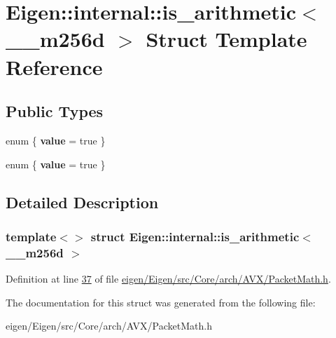 \hypertarget{struct_eigen_1_1internal_1_1is__arithmetic_3_01____m256d_01_4}{}\section{Eigen\+:\+:internal\+:\+:is\+\_\+arithmetic$<$ \+\_\+\+\_\+m256d $>$ Struct Template Reference}
\label{struct_eigen_1_1internal_1_1is__arithmetic_3_01____m256d_01_4}
\subsection*{Public Types}
\begin{DoxyCompactItemize}
\item 
\mbox{\label{struct_eigen_1_1internal_1_1is__arithmetic_3_01____m256d_01_4_ae117bb3f62159e9cf04736f232c2cc60}} 
enum \{ {\bfseries value} = true
 \}
\item 
\mbox{\label{struct_eigen_1_1internal_1_1is__arithmetic_3_01____m256d_01_4_a7377ab3b2b2ab242855e0ad66f310d71}} 
enum \{ {\bfseries value} = true
 \}
\end{DoxyCompactItemize}


\subsection{Detailed Description}
\subsubsection*{template$<$$>$\newline
struct Eigen\+::internal\+::is\+\_\+arithmetic$<$ \+\_\+\+\_\+m256d $>$}



Definition at line \hyperlink{eigen_2_eigen_2src_2_core_2arch_2_a_v_x_2_packet_math_8h_source_l00037}{37} of file \hyperlink{eigen_2_eigen_2src_2_core_2arch_2_a_v_x_2_packet_math_8h_source}{eigen/\+Eigen/src/\+Core/arch/\+A\+V\+X/\+Packet\+Math.\+h}.



The documentation for this struct was generated from the following file\+:\begin{DoxyCompactItemize}
\item 
eigen/\+Eigen/src/\+Core/arch/\+A\+V\+X/\+Packet\+Math.\+h\end{DoxyCompactItemize}
